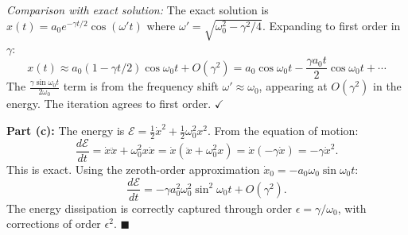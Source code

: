 \documentclass[12pt]{article}
\begin{document}
\emph{Comparison with exact solution:} The exact solution is $x(t) = a_0 e^{-\gamma t/2}\cos(\omega't)$ where $\omega' = \sqrt{\omega_0^2-\gamma^2/4}$. Expanding to first order in $\gamma$:
\[
x(t) \approx a_0(1-\gamma t/2)\cos\omega_0 t + O(\gamma^2) = a_0\cos\omega_0 t - \frac{\gamma a_0 t}{2}\cos\omega_0 t + \cdots
\]
The $\frac{\gamma\sin\omega_0 t}{2\omega_0}$ term is from the frequency shift $\omega'\approx\omega_0$, appearing at $O(\gamma^2)$ in the energy. The iteration agrees to first order. $\checkmark$

\textbf{Part (c):}
The energy is $\mathcal{E} = \frac{1}{2}\dot{x}^2 + \frac{1}{2}\omega_0^2 x^2$. From the equation of motion:
\[
\frac{d\mathcal{E}}{dt} = \dot{x}\ddot{x} + \omega_0^2 x\dot{x} = \dot{x}(\ddot{x}+\omega_0^2 x) = \dot{x}(-\gamma\dot{x}) = -\gamma\dot{x}^2.
\]
This is exact. Using the zeroth-order approximation $\dot{x}_0 = -a_0\omega_0\sin\omega_0 t$:
\[
\frac{d\mathcal{E}}{dt} = -\gamma a_0^2\omega_0^2\sin^2\omega_0 t + O(\gamma^2).
\]
The energy dissipation is correctly captured through order $\epsilon = \gamma/\omega_0$, with corrections of order $\epsilon^2$. $\blacksquare$
\end{document}
